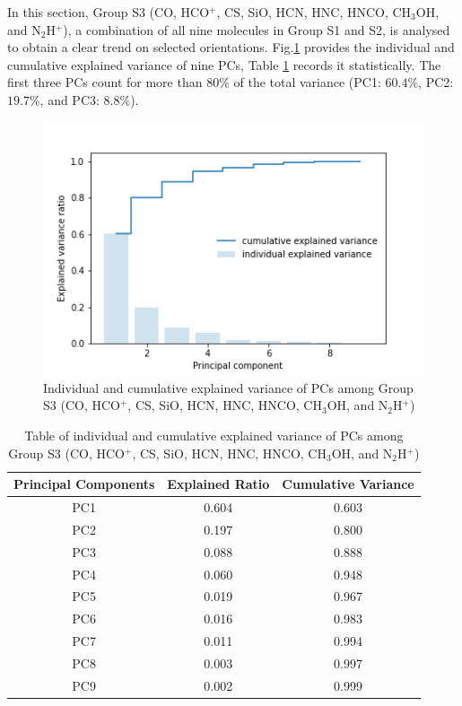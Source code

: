 \documentclass{aa}
\begin{document}
\begin{CJK*}{UTF8}{gbsn}
    In this section, Group S3 (CO, HCO$^+$, CS, SiO, HCN, HNC, HNCO, CH$_3$OH, and N$_2$H$^+$), a combination of all nine molecules in Group S1 and S2, is analysed to obtain a clear trend on selected orientations. 
    Fig.\ref{Fig-shock3-varianve} provides the individual and cumulative explained variance of nine PCs, Table \ref{table-shock-3-1} records it statistically. The first three PCs count for more than $80\%$ of the total variance (PC1: $60.4\%$, PC2: $19.7\%$, and PC3: $8.8\%$). 

  \begin{figure}[htbp]
       \centering
       \captionsetup{justification=centering}
       \includegraphics[angle=0,scale =0.6]{shock-3/explained_variance_ratio.png}
       \caption{Individual and cumulative explained variance of PCs among Group S3 (CO, HCO$^+$, CS, SiO, HCN, HNC, HNCO, CH$_3$OH, and N$_2$H$^+$)}
        \label{Fig-shock3-varianve}
   \end{figure}
   
    \begin{table}[htbp]
        \centering
        \begin{tabular}{ccc}
        \hline\hline
        \multicolumn{1}{l}{Principal Components} & \multicolumn{1}{l}{Explained Ratio} & Cumulative Variance \\ \hline
                PC1 & 0.604  & 0.603\\ 
                PC2 & 0.197  & 0.800\\
                PC3 & 0.088  & 0.888\\
                PC4 & 0.060  & 0.948\\ 
                PC5 & 0.019  & 0.967\\
                PC6 & 0.016  & 0.983\\
                PC7 & 0.011  & 0.994\\
                PC8 & 0.003  & 0.997\\
                PC9 & 0.002  & 0.999\\\hline\hline
        \end{tabular}
        \caption{Table of individual and cumulative explained variance of PCs among Group S3 (CO, HCO$^+$, CS, SiO, HCN, HNC, HNCO, CH$_3$OH, and N$_2$H$^+$)}
        \label{table-shock-3-1}
    \end{table}


\end{CJK*}
\end{document}
